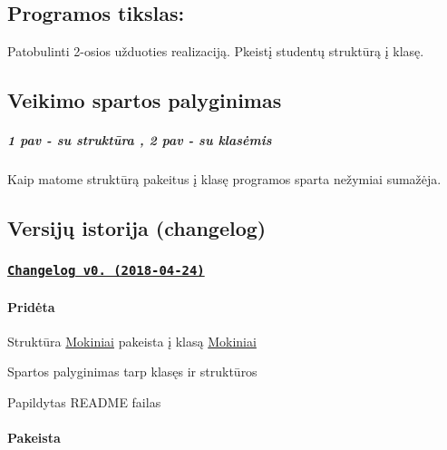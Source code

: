 \subsection*{Programos tikslas\+:}


\begin{DoxyItemize}
\item Patobulinti 2-\/osios užduoties realizaciją. Pkeistį studentų struktūrą į klasę.
\end{DoxyItemize}

\subsection*{Veikimo spartos palyginimas}

  \subparagraph*{1 pav -\/ su struktūra , 2 pav -\/ su klasėmis}


\begin{DoxyItemize}
\item Kaip matome struktūrą pakeitus į klasę programos sparta nežymiai sumažėja.
\end{DoxyItemize}

\subsection*{Versijų istorija (changelog)}

\subsubsection*{\href{https://github.com/PauliusKu/OP-3/releases/tag/v0.1}{\tt Changelog v0. (2018-\/04-\/24)}}

\paragraph*{Pridėta}


\begin{DoxyItemize}
\item Struktūra \mbox{\hyperlink{class_mokiniai}{Mokiniai}} pakeista į klasą \mbox{\hyperlink{class_mokiniai}{Mokiniai}}
\item Spartos palyginimas tarp klasęs ir struktūros
\item Papildytas R\+E\+A\+D\+ME failas \paragraph*{Pakeista}
\end{DoxyItemize}

